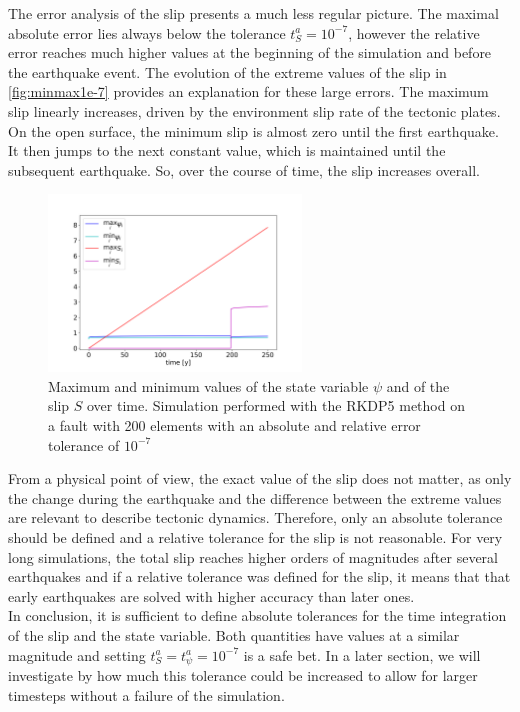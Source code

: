 The error analysis of the slip presents a much less regular picture. The maximal absolute error lies always below the tolerance $t_S^a = 10^{-7}$, however the relative error reaches much higher values at the beginning of the simulation and before the earthquake event. The evolution of the extreme values of the slip in \autoref{fig:minmax1e-7} provides an explanation for these large errors. The maximum slip linearly increases, driven by the environment slip rate of the tectonic plates. On the open surface, the minimum slip is almost zero until the first earthquake. It then jumps to the next constant value, which is maintained until the subsequent earthquake. So, over the course of time, the slip increases overall. \\

\begin{figure}[H]
	\centering
	\includegraphics[width=0.6\textwidth]{images/TANDEMtimeEvolutionMinMaxAll_RKDP5.png}
	\caption{Maximum and minimum values of the state variable $\psi$ and of the slip $S$ over time. Simulation performed with the RKDP5 method on a fault with 200 elements with an absolute and relative error tolerance of $10^{-7}$}
	\label{fig:minmax1e-7}
\end{figure}

From a physical point of view, the exact value of the slip does not matter, as only the change during the earthquake and the difference between the extreme values are relevant to describe tectonic dynamics. Therefore, only an absolute tolerance should be defined and a relative tolerance for the slip is not reasonable. For very long simulations, the total slip reaches higher orders of magnitudes after several earthquakes and if a relative tolerance was defined for the slip, it means that that early earthquakes are solved with higher accuracy than later ones. \\
In conclusion, it is sufficient to define absolute tolerances for the time integration of the slip and the state variable. Both quantities have values at a similar magnitude and setting $t_S^a = t_{\psi}^a = 10^{-7}$ is a safe bet. In a later section, we will investigate by how much this tolerance could be increased to allow for larger timesteps without a failure of the simulation.

